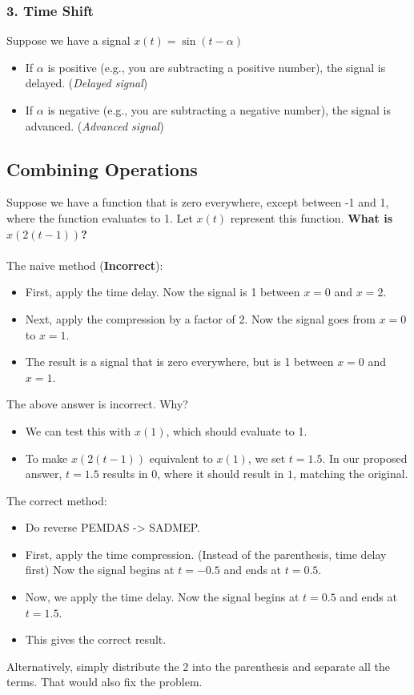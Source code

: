 \documentclass[10pt]{article}
\begin{document}
\subsubsection*{3. Time Shift}
Suppose we have a signal $x(t) = \sin(t - \alpha)$
\begin{itemize}
    \item If $\alpha$ is positive (e.g., you are subtracting a positive number), the signal is delayed.  (\textit{Delayed signal})
    \item If $\alpha$ is negative (e.g., you are subtracting a negative number), the signal is advanced. (\textit{Advanced signal})
\end{itemize}
\subsection*{Combining Operations}
Suppose we have a function that is zero everywhere, except between -1 and 1, where the function evaluates to 1.  Let $x(t)$ represent this function.
\textbf{What is $x(2(t - 1))$?}\\\\
The naive method (\textbf{Incorrect}):
\begin{itemize}
    \item First, apply the time delay.  Now the signal is 1 between $x=0$ and $x=2$.
    \item Next, apply the compression by a factor of 2.  Now the signal goes from $x=0$ to $x=1$.
    \item The result is a signal that is zero everywhere, but is 1 between $x = 0$ and $x = 1$.
\end{itemize}
The above answer is incorrect.  Why?
\begin{itemize}
    \item We can test this with $x(1)$, which should evaluate to 1.
    \item To make $x(2(t - 1))$ equivalent to $x(1)$, we set $t = 1.5$.  In our proposed answer, $t = 1.5$ results in 0, where it should result in $1$, matching the original.
\end{itemize}
The correct method:
\begin{itemize}
    \item Do reverse PEMDAS -> SADMEP.
    \item First, apply the time compression.  (Instead of the parenthesis, time delay first)  Now the signal begins at $t = -0.5$ and ends at $t = 0.5$.
    \item Now, we apply the time delay.  Now the signal begins at $t = 0.5$ and ends at $t = 1.5$.
    \item This gives the correct result. 
\end{itemize}
Alternatively, simply distribute the 2 into the parenthesis and separate all the terms.  That would also fix the problem.
\end{document}
